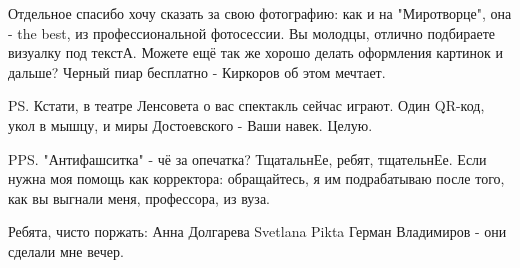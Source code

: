 Отдельное спасибо хочу сказать за свою фотографию: как и на "Миротворце", она -
the best, из профессиональной фотосессии. Вы молодцы, отлично подбираете
визуалку под текстА. Можете ещё так же хорошо делать оформления картинок и
дальше? Черный пиар бесплатно - Киркоров об этом мечтает. 

PS. Кстати, в театре Ленсовета о вас спектакль сейчас играют. Один QR-код, укол
в мышцу, и миры Достоевского - Ваши навек. Целую.

PPS. "Антифашситка" - чё за опечатка? ТщатальнЕе, ребят, тщательнЕе. Если нужна
моя помощь как корректора: обращайтесь, я им подрабатываю после того, как вы
выгнали меня, профессора, из вуза. 

Ребята, чисто поржать: Анна Долгарева Svetlana Pikta Герман Владимиров - они
сделали мне вечер.

